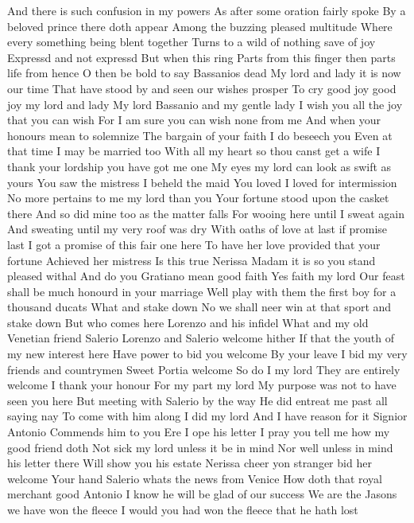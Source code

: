And there is such confusion in my powers 
As after some oration fairly spoke 
By a beloved prince there doth appear 
Among the buzzing pleased multitude 
Where every something being blent together 
Turns to a wild of nothing save of joy 
Expressd and not expressd But when this ring 
Parts from this finger then parts life from hence 
O then be bold to say Bassanios dead 
My lord and lady it is now our time 
That have stood by and seen our wishes prosper 
To cry good joy good joy my lord and lady 
My lord Bassanio and my gentle lady 
I wish you all the joy that you can wish 
For I am sure you can wish none from me 
And when your honours mean to solemnize 
The bargain of your faith I do beseech you 
Even at that time I may be married too 
With all my heart so thou canst get a wife 
I thank your lordship you have got me one 
My eyes my lord can look as swift as yours 
You saw the mistress I beheld the maid 
You loved I loved for intermission 
No more pertains to me my lord than you 
Your fortune stood upon the casket there 
And so did mine too as the matter falls 
For wooing here until I sweat again 
And sweating until my very roof was dry 
With oaths of love at last if promise last 
I got a promise of this fair one here 
To have her love provided that your fortune 
Achieved her mistress 
Is this true Nerissa 
Madam it is so you stand pleased withal 
And do you Gratiano mean good faith 
Yes faith my lord 
Our feast shall be much honourd in your marriage 
Well play with them the first boy for a thousand ducats 
What and stake down 
No we shall neer win at that sport and stake down 
But who comes here Lorenzo and his infidel What 
and my old Venetian friend Salerio 
Lorenzo and Salerio welcome hither 
If that the youth of my new interest here 
Have power to bid you welcome By your leave 
I bid my very friends and countrymen 
Sweet Portia welcome 
So do I my lord 
They are entirely welcome 
I thank your honour For my part my lord 
My purpose was not to have seen you here 
But meeting with Salerio by the way 
He did entreat me past all saying nay 
To come with him along 
I did my lord 
And I have reason for it Signior Antonio 
Commends him to you 
Ere I ope his letter 
I pray you tell me how my good friend doth 
Not sick my lord unless it be in mind 
Nor well unless in mind his letter there 
Will show you his estate 
Nerissa cheer yon stranger bid her welcome 
Your hand Salerio whats the news from Venice 
How doth that royal merchant good Antonio 
I know he will be glad of our success 
We are the Jasons we have won the fleece 
I would you had won the fleece that he hath lost 

